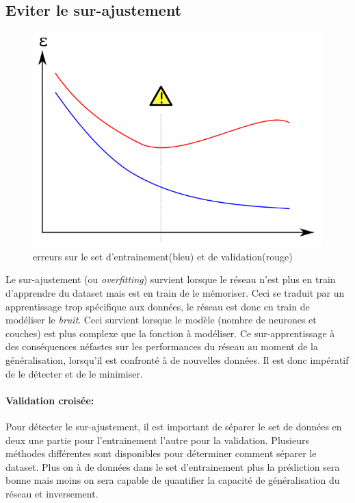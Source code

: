 \documentclass[11pt]{article}
\begin{document}
\subsection{Eviter le sur-ajustement}\label{overfitting}
\begin{figure}[htp]
	\centering
	\includegraphics[scale=.4]{img/overfitting.png}
	\caption{erreurs sur le set d'entrainement(bleu) et de validation(rouge)}
\end{figure}
Le sur-ajustement (ou {\em overfitting}) survient lorsque le r\'eseau n'est plus
en train d'apprendre du dataset mais est en train de le m\'emoriser. Ceci se
traduit par un apprentissage trop sp\'ecifique aux donn\'ees, le r\'eseau est
donc en train de mod\'eliser le {\em bruit}. Ceci survient lorsque le mod\`ele
(nombre de neurones et couches) est plus complexe que la fonction \`a
mod\'eliser. Ce sur-apprentissage \`a des cons\'equences n\'efastes sur les
performances du r\'eseau au moment de la g\'en\'eralisation, lorsqu'il est
confront\'e \`a de nouvelles donn\'ees. Il est donc imp\'eratif de le
d\'etecter et de le minimiser.

\paragraph{Validation crois\'ee:} Pour d\'etecter le sur-ajustement, il est
important de s\'eparer le set de donn\'ees en deux une partie pour l'entrainement
l'autre pour la validation. Plusieurs m\'ethodes diff\'erentes sont disponibles
pour d\'eterminer comment s\'eparer le dataset. Plus on \`a de donn\'ees dans le set
d'entrainement plus la pr\'ediction sera bonne mais moins on sera capable de
quantifier la capacit\'e de g\'en\'eralisation du r\'eseau et inversement.
\end{document}

